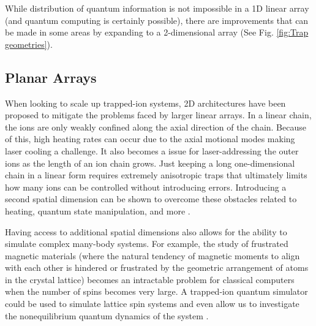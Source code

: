 While distribution of quantum information is not impossible in a 1D linear array (and quantum computing is certainly possible), there are improvements that can be made in some areas by expanding to a 2-dimensional array (See Fig. \ref{fig:Trap geometries}).

\subsection{Planar Arrays}
When looking to scale up trapped-ion systems, 2D architectures have been proposed to mitigate the problems faced by larger linear arrays. In a linear chain, the ions are only weakly confined along the axial direction of the chain. Because of this, high heating rates can occur due to the axial motional modes making laser cooling a challenge. It also becomes a issue for laser-addressing the outer ions as the length of an ion chain grows. Just keeping a long one-dimensional chain in a linear form requires extremely anisotropic traps that ultimately limits how many ions can be controlled without introducing errors. Introducing a second spatial dimension can be shown to overcome these obstacles related to heating, quantum state manipulation, and more \cite{Kiesenhofer}.

Having access to additional spatial dimensions also allows for the ability to simulate complex many-body systems. For example, the study of frustrated magnetic materials (where the natural tendency of magnetic moments to align with each other is hindered or frustrated by the geometric arrangement of atoms in the crystal lattice) becomes an intractable problem for classical computers when the number of spins becomes very large. A trapped-ion quantum simulator could be used to simulate lattice spin systems and even allow us to investigate the nonequilibrium quantum dynamics of the system \cite{Yoshimura}. 


